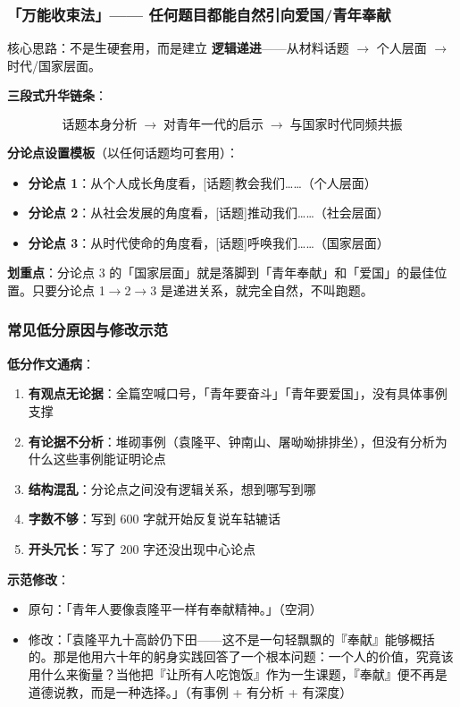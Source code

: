 \subsubsection{「万能收束法」—— 任何题目都能自然引向爱国/青年奉献}

核心思路：不是生硬套用，而是建立 \textbf{逻辑递进}——从材料话题 $\to$ 个人层面 $\to$ 时代/国家层面。

\textbf{三段式升华链条}：

\[
\text{话题本身分析} \;\longrightarrow\; \text{对青年一代的启示} \;\longrightarrow\; \text{与国家时代同频共振}
\]

\textbf{分论点设置模板}（以任何话题均可套用）：

\begin{itemize}
  \item \textbf{分论点 1}：从个人成长角度看，[话题]教会我们……（个人层面）
  \item \textbf{分论点 2}：从社会发展的角度看，[话题]推动我们……（社会层面）
  \item \textbf{分论点 3}：从时代使命的角度看，[话题]呼唤我们……（国家层面）
\end{itemize}

\textbf{划重点}：分论点 3 的「国家层面」就是落脚到「青年奉献」和「爱国」的最佳位置。只要分论点 1$\to$2$\to$3 是递进关系，就完全自然，不叫跑题。

\subsubsection{常见低分原因与修改示范}

\textbf{低分作文通病}：

\begin{enumerate}
  \item \textbf{有观点无论据}：全篇空喊口号，「青年要奋斗」「青年要爱国」，没有具体事例支撑
  \item \textbf{有论据不分析}：堆砌事例（袁隆平、钟南山、屠呦呦排排坐），但没有分析为什么这些事例能证明论点
  \item \textbf{结构混乱}：分论点之间没有逻辑关系，想到哪写到哪
  \item \textbf{字数不够}：写到 600 字就开始反复说车轱辘话
  \item \textbf{开头冗长}：写了 200 字还没出现中心论点
\end{enumerate}

\textbf{示范修改}：

\begin{itemize}
  \item[✗] 原句：「青年人要像袁隆平一样有奉献精神。」（空洞）
  \item[✓] 修改：「袁隆平九十高龄仍下田——这不是一句轻飘飘的『奉献』能够概括的。那是他用六十年的躬身实践回答了一个根本问题：一个人的价值，究竟该用什么来衡量？当他把『让所有人吃饱饭』作为一生课题，『奉献』便不再是道德说教，而是一种选择。」（有事例 + 有分析 + 有深度）
\end{itemize}

